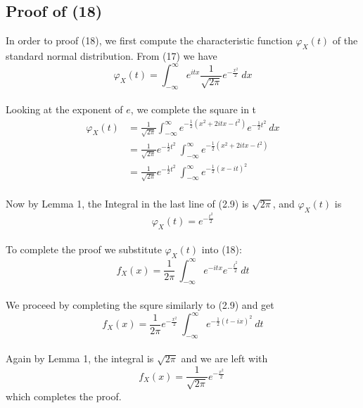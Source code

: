 \documentclass[paper=a4, fontsize=11pt]{scrartcl} %
\numberwithin{equation}{section} %
\numberwithin{figure}{section} %
\numberwithin{table}{section} %
\begin{document}
\subsection{Proof of (18)}
In order to proof (18), we first compute the characteristic function $\varphi_X(t)$ of the standard normal distribution. From (17) we have
\begin{equation}
	\varphi_X(t) = \int_{-\infty}^{\infty}{e^{itx} \frac{1}{\sqrt{2\pi}} e^{-\frac{x^2}{2}}\ dx}
\end{equation}
\\
Looking at the exponent of $e$, we complete the square in t
\begin{equation}
	\begin{aligned}
	\varphi_X(t) &= \frac{1}{\sqrt{2\pi}} \int_{-\infty}^{\infty}{e^{-\frac{1}{2} (x^2 +2itx -t^2)}  e^{-\frac{1}{2}t^2}\ dx} \\
	&= \frac{1}{\sqrt{2\pi}} e^{-\frac{1}{2}t^2}\ \int_{-\infty}^{\infty}{e^{-\frac{1}{2} (x^2 +2itx -t^2)}} \\
	&= \frac{1}{\sqrt{2\pi}} e^{-\frac{1}{2}t^2}\ \int_{-\infty}^{\infty}{e^{-\frac{1}{2} (x - it)^2}}
	\end{aligned}
\end{equation}
\\
Now by Lemma 1, the Integral in the last line of (2.9) is $\sqrt{2\pi}$, and $\varphi_X(t)$ is
\begin{equation}
	\varphi_X(t) = e^{-\frac{t^2}{2}}
\end{equation}
\\
To complete the proof we substitute $\varphi_X(t)$ into (18):
\begin{equation}
	f_X(x) = \frac{1}{2\pi}\ \int_{-\infty}^{\infty}{e^{-itx} e^{-\frac{t^2}{2}}\ dt}
\end{equation}
\\
We proceed by completing the squre similarly to (2.9) and get
\begin{equation}
	f_X(x) = \frac{1}{2\pi} e^{-\frac{x^2}{2}}\ \int_{-\infty}^{\infty}{e^{-\frac{1}{2} (t - ix)^2}\ dt}
\end{equation}
\\
Again by Lemma 1, the integral is $\sqrt{2\pi}$ and we are left with
\begin{equation}
	f_X(x) = \frac{1}{\sqrt{2\pi}} e^{-\frac{x^2}{2}}\ 
\end{equation}
which completes the proof.
\end{document}
